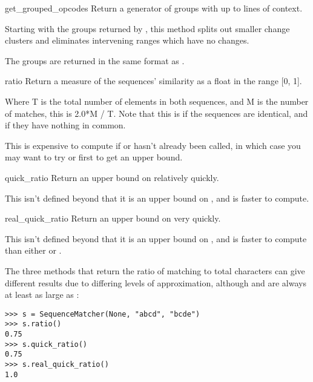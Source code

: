 \begin{methoddesc}{get_grouped_opcodes}{}
  Return a generator of groups with up to  lines of context.

  Starting with the groups returned by ,
  this method splits out smaller change clusters and eliminates
  intervening ranges which have no changes.

  The groups are returned in the same format as .
\end{methoddesc}

\begin{methoddesc}{ratio}{}
  Return a measure of the sequences' similarity as a float in the
  range [0, 1].

  Where T is the total number of elements in both sequences, and M is
  the number of matches, this is 2.0*M / T. Note that this is
   if the sequences are identical, and  if they
  have nothing in common.

  This is expensive to compute if  or
   hasn't already been called, in which case you
  may want to try  or
   first to get an upper bound.
\end{methoddesc}

\begin{methoddesc}{quick_ratio}{}
  Return an upper bound on  relatively quickly.

  This isn't defined beyond that it is an upper bound on
  , and is faster to compute.
\end{methoddesc}

\begin{methoddesc}{real_quick_ratio}{}
  Return an upper bound on  very quickly.

  This isn't defined beyond that it is an upper bound on
  , and is faster to compute than either
   or .
\end{methoddesc}

The three methods that return the ratio of matching to total characters
can give different results due to differing levels of approximation,
although  and  are always
at least as large as :

\begin{verbatim}
>>> s = SequenceMatcher(None, "abcd", "bcde")
>>> s.ratio()
0.75
>>> s.quick_ratio()
0.75
>>> s.real_quick_ratio()
1.0
\end{verbatim}


